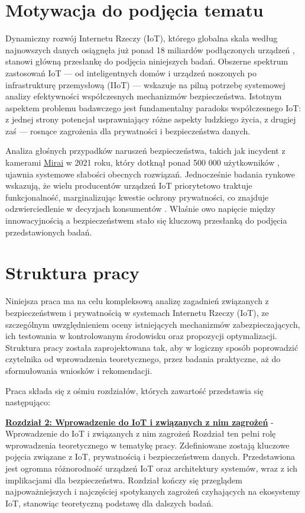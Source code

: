 \section{Motywacja do podjęcia tematu}
Dynamiczny rozwój Internetu Rzeczy (IoT), którego globalna skala według najnowszych danych osiągnęła już ponad 18 miliardów podłączonych urządzeń \cite{iotanalytics2024}, stanowi główną przesłankę do podjęcia niniejszych badań. Obszerne spektrum zastosowań IoT — od inteligentnych domów i urządzeń noszonych po infrastrukturę przemysłową (IIoT) — wskazuje na pilną potrzebę systemowej analizy efektywności współczesnych mechanizmów bezpieczeństwa. Istotnym aspektem problemu badawczego jest fundamentalny paradoks współczesnego IoT: z jednej strony potencjał usprawniający różne aspekty ludzkiego życia, z drugiej zaś — rosnące zagrożenia dla prywatności i bezpieczeństwa danych.

Analiza głośnych przypadków naruszeń bezpieczeństwa, takich jak incydent z kamerami \hyperref[subsec:mirai]{Mirai} w 2021 roku, który dotknął ponad 500 000 użytkowników \cite{sharad2020mirai}, ujawnia systemowe słabości obecnych rozwiązań. Jednocześnie badania rynkowe wskazują, że wielu producentów urządzeń IoT priorytetowo traktuje funkcjonalność, marginalizując kwestie ochrony prywatności, co znajduje odzwierciedlenie w decyzjach konsumentów \cite{cisco2024}. Właśnie owo napięcie między innowacyjnością a bezpieczeństwem stało się kluczową przesłanką do podjęcia przedstawionych badań. 

\section{Struktura pracy}
Niniejsza praca ma na celu kompleksową analizę zagadnień związanych z bezpieczeństwem i prywatnością w systemach Internetu Rzeczy (IoT), ze szczególnym uwzględnieniem oceny istniejących mechanizmów zabezpieczających, ich testowania w kontrolowanym środowisku oraz propozycji optymalizacji. Struktura pracy została zaprojektowana tak, aby w logiczny sposób poprowadzić czytelnika od wprowadzenia teoretycznego, przez badania praktyczne, aż do sformułowania wniosków i rekomendacji.

Praca składa się z ośmiu rozdziałów, których zawartość przedstawia się następująco:

\textbf{\hyperref[chap:rozdzial2] {Rozdział 2: Wprowadzenie do IoT i związanych z nim zagrożeń}} - Wprowadzenie do IoT i związanych z nim zagrożeń
Rozdział ten pełni rolę wprowadzenia teoretycznego w tematykę pracy. Zdefiniowane zostają kluczowe pojęcia związane z IoT, prywatnością i bezpieczeństwem danych. Przedstawiona jest ogromna różnorodność urządzeń IoT oraz architektury systemów, wraz z ich implikacjami dla bezpieczeństwa. Rozdział kończy się przeglądem najpoważniejszych i najczęściej spotykanych zagrożeń czyhających na ekosystemy IoT, stanowiąc teoretyczną podstawę dla dalszych badań.

